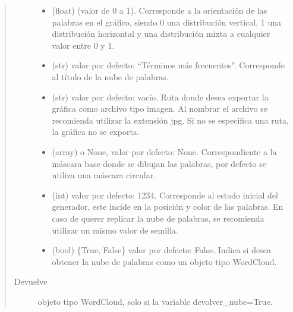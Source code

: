 \documentclass[letterpaper,10pt,openany,spanish]{sphinxmanual}
\begin{document}
\begin{fulllineitems}
\begin{quote}
\begin{description}
\begin{itemize}
\item {} 
 \textendash{} (float) (valor de 0 a 1). Corresponde a la orientación de las palabras en el gráfico, siendo 0 una distribución vertical, 1 una distribución horizontal y una distribución mixta a cualquier valor entre 0 y 1.

\item {} 
 \textendash{} (str) valor por defecto: “Términos más frecuentes”. Corresponde al título de la nube de palabras.

\item {} 
 \textendash{} (str) valor por defecto: vacío. Ruta donde desea exportar la gráfica como archivo tipo imagen. Al nombrar el archivo se recomienda utilizar la extensión jpg. Si no se especifica una ruta, la gráfica no se exporta.

\item {} 
 \textendash{} (array) o None, valor por defecto: None. Correspondiente a la máscara base donde se dibujan las palabras, por defecto se utiliza una máscara circular.

\item {} 
 \textendash{} (int) valor por defecto: 1234. Corresponde al estado inicial del generador, este incide en la posición y color de las palabras. En caso de querer replicar la nube de palabras, se recomienda utilizar un mismo valor de semilla.

\item {} 
 \textendash{} (bool) \{True, False\} valor por defecto: False. Indica si desea obtener la nube de palabras como un objeto tipo WordCloud.

\end{itemize}

\item[{Devuelve}] \leavevmode
objeto tipo WordCloud, solo si la variable devolver\_nube=True.

\end{description}\end{quote}

\end{fulllineitems}

\end{document}
